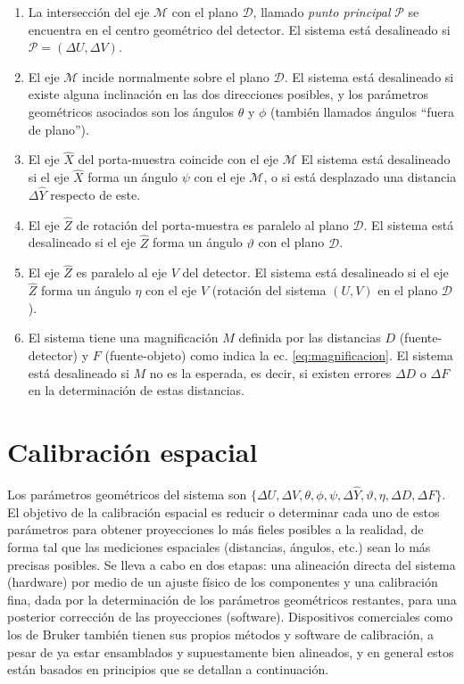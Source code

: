 \begin{enumerate}[label=\alph*)]
    \item La intersección del eje $\mathcal{M}$ con el plano $\mathcal{D}$, llamado
    \textit{punto principal} $\mathcal{P}$ se encuentra en el centro geométrico
    del detector. El sistema está desalineado si $\mathcal{P}=(\Delta U, \Delta V)$.
    \item El eje $\mathcal{M}$ incide normalmente sobre el plano $\mathcal{D}$. El
    sistema está desalineado si existe alguna inclinación en las dos direcciones
    posibles, y los parámetros geométricos asociados son los ángulos $\theta$ y $\phi$
    (también llamados ángulos ``fuera de plano'').
    \item El eje $\hat{X}$ del porta-muestra coincide con el eje $\mathcal{M}$
    El sistema está desalineado si el eje $\hat{X}$ forma un ángulo $\psi$ con el 
    eje $\mathcal{M}$, o si está desplazado una distancia $\Delta \hat{Y}$ respecto
    de este.
    \item El eje $\hat{Z}$ de rotación del porta-muestra es paralelo al plano $\mathcal{D}$.
    El sistema está desalineado si el eje $\hat{Z}$ forma un ángulo $\vartheta$ con el plano
    $\mathcal{D}$.
    \item El eje $\hat{Z}$ es paralelo al eje $V$ del detector. El sistema está desalineado
    si el eje $\hat{Z}$ forma un ángulo $\eta$ con el eje $V$ (rotación del sistema $(U,V)$
    en el plano $\mathcal{D}$).
    \item El sistema tiene una magnificación $M$ definida por las distancias $D$
    (fuente-detector) y $F$ (fuente-objeto) como indica la ec. \ref{eq:magnificacion}.
    El sistema está desalineado si $M$ no es la esperada, es decir, si existen errores
    $\Delta D$ o $\Delta F$ en la determinación de estas distancias. 

\end{enumerate}

\section{Calibración espacial} \label{sec:calibracion_espacial}

Los parámetros geométricos del sistema son $\{\Delta U, \Delta V, \theta,
\phi, \psi, \Delta \hat{Y}, \vartheta, \eta, \Delta D, \Delta F\}$. El objetivo de la
calibración espacial es reducir o determinar cada uno de estos parámetros
para obtener proyecciones lo más fieles posibles a la realidad, de forma tal que las
mediciones espaciales (distancias, ángulos, etc.) sean lo más precisas posibles. Se
lleva a cabo en dos etapas: una alineación directa del sistema (hardware) por medio
de un ajuste físico de los componentes y una calibración fina, dada por la determinación de
los parámetros geométricos restantes, para una posterior corrección de las proyecciones
(software). Dispositivos comerciales como los de Bruker también tienen sus propios
métodos y software de calibración, a pesar de ya estar ensamblados y supuestamente bien
alineados, y en general estos están basados en principios que se detallan a continuación.

